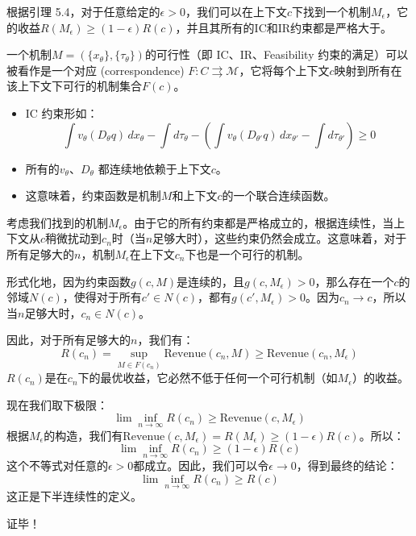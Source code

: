 根据引理 5.4，对于任意给定的$\epsilon > 0$，我们可以在上下文$c$下找到一个机制$M_{\epsilon}$，它的收益$R(M_\epsilon)\geq (1-\epsilon)R(c)$，并且其所有的IC和IR约束都是严格大于。

一个机制$M=(\{x_\theta\},\{\tau_\theta\})$的可行性（即 IC、IR、Feasibility 约束的满足）可以被看作是一个对应 (correspondence) $F:C\rightrightarrows \mathcal{M}$，它将每个上下文$c$映射到所有在该上下文下可行的机制集合$F(c)$。
\begin{itemize}
    \item IC 约束形如：$$\int v_{\theta}(D_{\theta}q)\,dx_{\theta} - \int d\tau_{\theta} - \left(\int v_{\theta}(D_{\theta'}q)\,dx_{\theta'} - \int d\tau_{\theta'}\right)\geq 0$$
    \item 所有的$v_\theta$、$D_\theta$ 都连续地依赖于上下文$c$。
    \item 这意味着，约束函数是机制$M$和上下文$c$的一个联合连续函数。
\end{itemize}

考虑我们找到的机制$M_{\epsilon}$。由于它的所有约束都是严格成立的，根据连续性，当上下文从$c$稍微扰动到$c_n$时（当$n$足够大时），这些约束仍然会成立。这意味着，对于所有足够大的$n$，机制$M_{\epsilon}$在上下文$c_n$下也是一个可行的机制。

形式化地，因为约束函数$g(c,M)$是连续的，且$g(c, M_{\epsilon})>0$，那么存在一个$c$的邻域$N(c)$，使得对于所有$c' \in N(c)$，都有$g(c',M_{\epsilon})>0$。因为$c_n\to c$，所以当$n$足够大时，$c_n \in N(c)$。

因此，对于所有足够大的$n$，我们有：
$$R(c_n)=\sup_{M\in F(c_n)} \text{Revenue}(c_n,M)\geq \text{Revenue}(c_n,M_{\epsilon})$$
$R(c_n)$是在$c_n$下的最优收益，它必然不低于任何一个可行机制（如$M_{\epsilon}$）的收益。

现在我们取下极限：
$$\lim\inf_{n\to\infty} R(c_n)\geq \text{Revenue}(c,M_{\epsilon})$$
根据$M_{\epsilon}$的构造，我们有$\text{Revenue}(c,M_{\epsilon}) = R(M_{\epsilon})\geq (1 - \epsilon)R(c)$。所以：
$$\lim\inf_{n\to\infty} R(c_n)\geq (1-\epsilon)R(c)$$
这个不等式对任意的$\epsilon>0$都成立。因此，我们可以令$\epsilon\to 0$，得到最终的结论：
$$\lim\inf_{n\to\infty}R(c_n)\geq R(c)$$
这正是下半连续性的定义。

证毕！